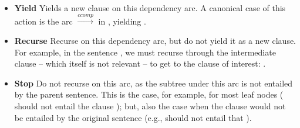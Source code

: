 \vspace{-1ex}
\begin{itemize}[leftmargin=2ex]
\item[] \textbf{Yield} \hspace{1ex}
  Yields a new clause on this dependency arc.
  A canonical case of this action is the arc 
     $\xrightarrow{ccomp}$  in
    , yielding
    .

\item[] \textbf{Recurse} \hspace{1ex}
  Recurse on this dependency arc, but do not yield it as a new clause.
  For example, in the sentence , we must recurse through the intermediate clause
   -- which itself is not relevant
  -- to get to the clause of interest: .

\item[] \textbf{Stop}  \hspace{1ex}
  Do not recurse on this arc, as the subtree under this arc is
    not entailed by the parent sentence.
  This is the case, for example, for most leaf nodes
    ( should not entail the clause );
    but, also the case when the clause would not be entailed by the original
    sentence (e.g., 
    should not entail that ).
\end{itemize}


